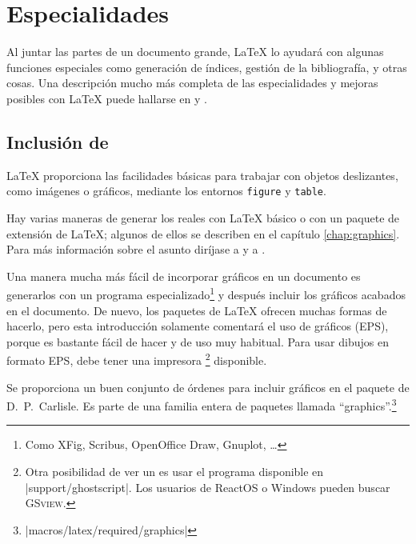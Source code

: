  
\chapter{Especialidades}
\begin{intro}
    Al juntar las partes de un documento grande,  \LaTeX{} lo ayudará con algunas funciones especiales como generación de índices, gestión de la bibliografía, y otras cosas.  Una descripción mucho más completa de las especialidades y mejoras posibles con  \LaTeX{} puede hallarse en {\normalfont\manual{}} y {\normalfont \companion}.
\end{intro}

\section{Inclusión de \EPSi{}}\label{eps}

\LaTeX{} proporciona las facilidades básicas para trabajar con objetos deslizantes, como imágenes o gráficos, mediante los entornos \texttt{figure} y \texttt{table}.

Hay varias maneras de generar los  reales con  \LaTeX{} básico o con un paquete de extensión de \LaTeX{}; algunos de ellos se describen en el capítulo \ref{chap:graphics}.  Para más información sobre el asunto diríjase a \companion{} y a \manual{}.

Una manera mucha más fácil de incorporar gráficos en un documento es generarlos con un programa especializado\footnote{Como XFig, Scribus, OpenOffice Draw, Gnuplot, \ldots} y después incluir los gráficos acabados en el documento.  De nuevo, los paquetes de \LaTeX{} ofrecen muchas formas de hacerlo, pero esta introducción solamente comentará el uso de gráficos \EPSi{} (EPS), porque es bastante fácil de hacer y de uso muy habitual.  Para usar dibujos en formato EPS, debe tener una impresora \PSi{}\footnote{Otra posibilidad de ver un \PSi{} es usar el programa \textsc{} disponible en \CTANref|support/ghostscript|.  Los usuarios de ReactOS o Windows pueden buscar \textsc{GSview}.} disponible.

Se proporciona un buen conjunto de órdenes para incluir gráficos en el paquete  de D.~P.~Carlisle.  Es parte de una familia entera de paquetes llamada ``graphics''.\footnote{\CTANref|macros/latex/required/graphics|}

